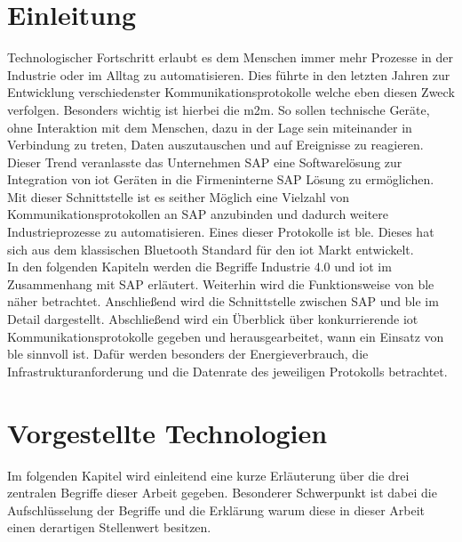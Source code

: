 \section{Einleitung}
\label{s:intro}

\noindent Technologischer Fortschritt erlaubt es dem Menschen immer mehr Prozesse in der Industrie oder im Alltag zu automatisieren. Dies führte in den letzten Jahren zur Entwicklung verschiedenster Kommunikationsprotokolle welche eben diesen Zweck verfolgen. Besonders wichtig ist hierbei die \ac{m2m}. So sollen technische Geräte, ohne Interaktion mit dem Menschen, dazu in der Lage sein miteinander in Verbindung zu treten, Daten auszutauschen und auf Ereignisse zu reagieren.\\ 

\noindent Dieser Trend veranlasste das Unternehmen SAP eine Softwarelösung zur Integration von \ac{iot} Geräten in die Firmeninterne SAP Lösung zu ermöglichen. Mit dieser Schnittstelle ist es seither Möglich eine Vielzahl von Kommunikationsprotokollen an SAP anzubinden und dadurch weitere Industrieprozesse zu automatisieren. Eines dieser Protokolle ist \ac{ble}. Dieses hat sich aus dem klassischen Bluetooth Standard für den \ac{iot} Markt entwickelt.\\

\noindent In den folgenden Kapiteln werden die Begriffe Industrie 4.0 und \ac{iot} im Zusammenhang mit SAP erläutert. Weiterhin wird die Funktionsweise von \ac{ble} näher betrachtet. Anschließend wird die Schnittstelle zwischen SAP und \ac{ble} im Detail dargestellt. Abschließend wird ein Überblick über konkurrierende \ac{iot} Kommunikationsprotokolle gegeben und herausgearbeitet, wann ein Einsatz von \ac{ble} sinnvoll ist. Dafür werden besonders der Energieverbrauch, die Infrastrukturanforderung und die Datenrate des jeweiligen Protokolls betrachtet.\\     

\section{Vorgestellte Technologien}
\label{s:grundlagen}

\noindent Im folgenden Kapitel wird einleitend eine kurze Erläuterung über die drei zentralen Begriffe dieser Arbeit gegeben. Besonderer Schwerpunkt ist dabei die Aufschlüsselung der Begriffe und die Erklärung warum diese in dieser Arbeit einen derartigen Stellenwert besitzen.\\ 

